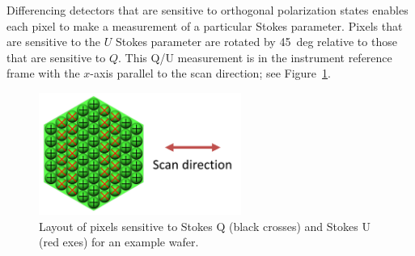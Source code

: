 \documentclass[]{spie}  %
\newcommand{\comb}[1]{\textcolor{blue}{#1}}
\begin{document}

Differencing detectors that are sensitive to orthogonal polarization states enables each pixel to make a measurement of 
a particular Stokes parameter. Pixels that are sensitive to the $U$ Stokes parameter are rotated by 45~deg relative to those
that are sensitive to $Q$. This Q/U measurement is in the instrument reference frame with the $x$-axis parallel to the scan 
direction; see Figure~\ref{fig:QU}. 

\begin{figure} [ht]
\begin{center}
\includegraphics[height=4cm]{QU_wafer.png}
\end{center}
\caption { \label{fig:QU} 
Layout of pixels sensitive to Stokes Q (black crosses) and Stokes U (red exes) for an example wafer.}
\end{figure}
\end{document}

